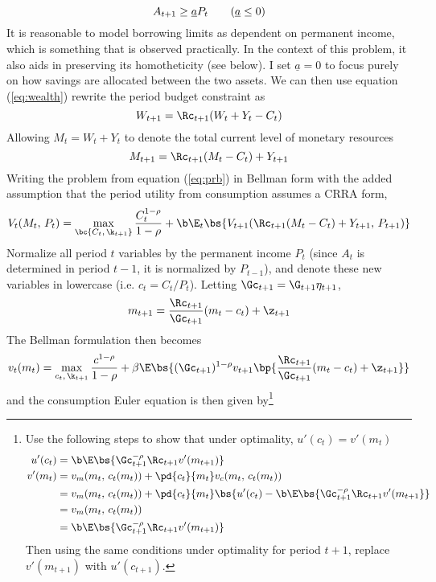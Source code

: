 \[
A_{t+1} \geq \underline{a}P_{t} \tag{$\underline{a} \leq 0$}
\]
It is reasonable to model borrowing limits as dependent on permanent income, which is something that is observed practically. In the context of this problem, it also aids in preserving its homotheticity (see below). I set $\underline{a} = 0$ to focus purely on how savings are allocated between the two assets. We can then use equation (\ref{eq:wealth}) rewrite the period budget constraint as
\[
W_{t+1} = \Rc_{t+1}(W_{t} + Y_{t} - C_{t})
\]
Allowing $M_t = W_t + Y_t$ to denote the total current level of monetary resources
\[
M_{t+1} = \Rc_{t+1}(M_t - C_t) + Y_{t+1}
\]
Writing the problem from equation (\ref{eq:prb}) in Bellman form with the added assumption that the period utility from consumption assumes a CRRA form,
\begin{equation}
    V_t(M_t,\,P_t) = \max_{\bc{C_t,\,\k_{t+1}}}\frac{C_{t}^{1-\rho}}{1 - \rho} + \b \E_t\bs{V_{t+1}(\Rc_{t+1}(M_t - C_{t}) + Y_{t+1},\,P_{t+1})}
\end{equation}
Normalize all period $t$ variables by the permanent income $P_t$ (since $A_t$ is determined in period $t-1$, it is normalized by $P_{t-1}$), and denote these new variables in lowercase (i.e. $c_t = C_t / P_t$). Letting $\Gc_{t+1} = \G_{t+1}\eta_{t+1}$,
\begin{align*}
    m_{t+1} = \frac{\Rc_{t+1}}{\Gc_{t+1}}(m_t - c_t) + \z_{t+1}
\end{align*}
The Bellman formulation then becomes
\begin{equation}\label{eq:bellman}
    v_{t}(m_t) = \max_{c_{t},\,\k_{t+1}}\frac{c^{1-\rho}}{1-\rho} + \beta \E\bs{(\Gc_{t+1})^{1-\rho}v_{t+1}\bp{\frac{\Rc_{t+1}}{\Gc_{t+1}}(m_t - c_t) + \z_{t+1}}}
\end{equation}
and the consumption Euler equation is then given by\footnote{Use the following steps to show that under optimality, $u'(c_t) = v'(m_t)$
\begin{align*}
    u'(c_t) &= \b \E\bs{\Gc_{t+1}^{-\rho}\Rc_{t+1}v'(m_{t+1})}\\
    v'(m_t) &= v_{m}(m_t,\,c_t(m_t)) + \pd{c_t}{m_t}v_{c}(m_t,\,c_t(m_t))\\
    &= v_{m}(m_t,\,c_t(m_t)) + \pd{c_t}{m_t}\bs{u'(c_t) - \b \E\bs{\Gc_{t+1}^{-\rho}\Rc_{t+1}v'(m_{t+1}}}\\
    &= v_{m}(m_t,\,c_t(m_t))\\
    &= \b \E\bs{\Gc_{t+1}^{-\rho}\Rc_{t+1}v'(m_{t+1})}
\end{align*}
Then using the same conditions under optimality for period $t+1$, replace $v'(m_{t+1})$ with $u'(c_{t+1})$.
}

